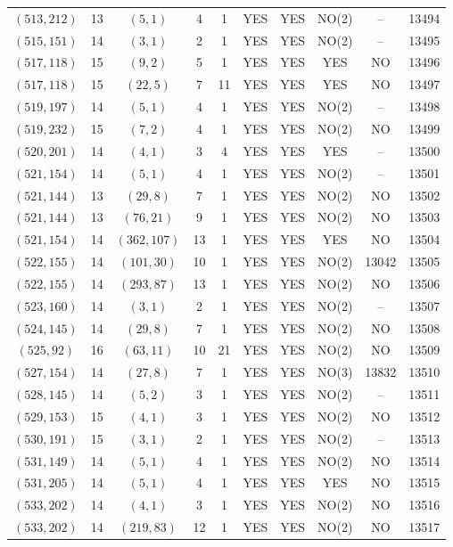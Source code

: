 \begin{longtable}{|c|c|c|c|c|c|c|c|c|c|}
$(513, 212)$ & 13 & $(5, 1)$ & 4 & 1 & YES & YES & NO(2) & -- & 13494\\
$(515, 151)$ & 14 & $(3, 1)$ & 2 & 1 & YES & YES & NO(2) & -- & 13495\\
$(517, 118)$ & 15 & $(9, 2)$ & 5 & 1 & YES & YES & YES & NO & 13496\\
$(517, 118)$ & 15 & $(22, 5)$ & 7 & 11 & YES & YES & YES & NO & 13497\\
$(519, 197)$ & 14 & $(5, 1)$ & 4 & 1 & YES & YES & NO(2) & -- & 13498\\
$(519, 232)$ & 15 & $(7, 2)$ & 4 & 1 & YES & YES & NO(2) & NO & 13499\\
$(520, 201)$ & 14 & $(4, 1)$ & 3 & 4 & YES & YES & YES & -- & 13500\\
$(521, 154)$ & 14 & $(5, 1)$ & 4 & 1 & YES & YES & NO(2) & -- & 13501\\
$(521, 144)$ & 13 & $(29, 8)$ & 7 & 1 & YES & YES & NO(2) & NO & 13502\\
$(521, 144)$ & 13 & $(76, 21)$ & 9 & 1 & YES & YES & NO(2) & NO & 13503\\
$(521, 154)$ & 14 & $(362, 107)$ & 13 & 1 & YES & YES & YES & NO & 13504\\
$(522, 155)$ & 14 & $(101, 30)$ & 10 & 1 & YES & YES & NO(2) & 13042 & 13505\\
$(522, 155)$ & 14 & $(293, 87)$ & 13 & 1 & YES & YES & NO(2) & NO & 13506\\
$(523, 160)$ & 14 & $(3, 1)$ & 2 & 1 & YES & YES & NO(2) & -- & 13507\\
$(524, 145)$ & 14 & $(29, 8)$ & 7 & 1 & YES & YES & NO(2) & NO & 13508\\
$(525, 92)$ & 16 & $(63, 11)$ & 10 & 21 & YES & YES & NO(2) & NO & 13509\\
$(527, 154)$ & 14 & $(27, 8)$ & 7 & 1 & YES & YES & NO(3) & 13832 & 13510\\
$(528, 145)$ & 14 & $(5, 2)$ & 3 & 1 & YES & YES & NO(2) & -- & 13511\\
$(529, 153)$ & 15 & $(4, 1)$ & 3 & 1 & YES & YES & NO(2) & NO & 13512\\
$(530, 191)$ & 15 & $(3, 1)$ & 2 & 1 & YES & YES & NO(2) & -- & 13513\\
$(531, 149)$ & 14 & $(5, 1)$ & 4 & 1 & YES & YES & NO(2) & NO & 13514\\
$(531, 205)$ & 14 & $(5, 1)$ & 4 & 1 & YES & YES & YES & NO & 13515\\
$(533, 202)$ & 14 & $(4, 1)$ & 3 & 1 & YES & YES & NO(2) & NO & 13516\\
$(533, 202)$ & 14 & $(219, 83)$ & 12 & 1 & YES & YES & NO(2) & NO & 13517\\

\end{longtable}
